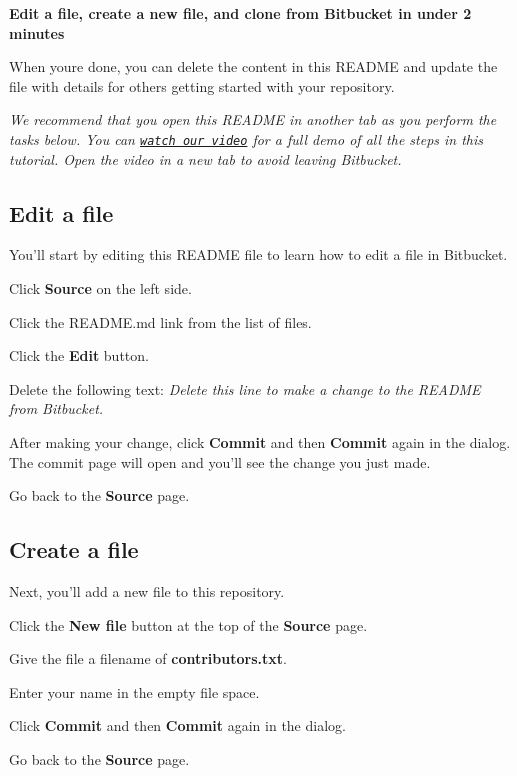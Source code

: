 {\bfseries Edit a file, create a new file, and clone from Bitbucket in under 2 minutes}

When you\textquotesingle{}re done, you can delete the content in this R\+E\+A\+D\+ME and update the file with details for others getting started with your repository.

{\itshape We recommend that you open this R\+E\+A\+D\+ME in another tab as you perform the tasks below. You can \href{https://youtu.be/0ocf7u76WSo}{\tt watch our video} for a full demo of all the steps in this tutorial. Open the video in a new tab to avoid leaving Bitbucket.} 



\subsection*{Edit a file}

You’ll start by editing this R\+E\+A\+D\+ME file to learn how to edit a file in Bitbucket.


\begin{DoxyEnumerate}
\item Click {\bfseries Source} on the left side.
\item Click the R\+E\+A\+D\+M\+E.\+md link from the list of files.
\item Click the {\bfseries Edit} button.
\item Delete the following text\+: {\itshape Delete this line to make a change to the R\+E\+A\+D\+ME from Bitbucket.}
\item After making your change, click {\bfseries Commit} and then {\bfseries Commit} again in the dialog. The commit page will open and you’ll see the change you just made.
\item Go back to the {\bfseries Source} page. 


\end{DoxyEnumerate}

\subsection*{Create a file}

Next, you’ll add a new file to this repository.


\begin{DoxyEnumerate}
\item Click the {\bfseries New file} button at the top of the {\bfseries Source} page.
\item Give the file a filename of {\bfseries contributors.\+txt}.
\item Enter your name in the empty file space.
\item Click {\bfseries Commit} and then {\bfseries Commit} again in the dialog.
\item Go back to the {\bfseries Source} page.
\end{DoxyEnumerate}

